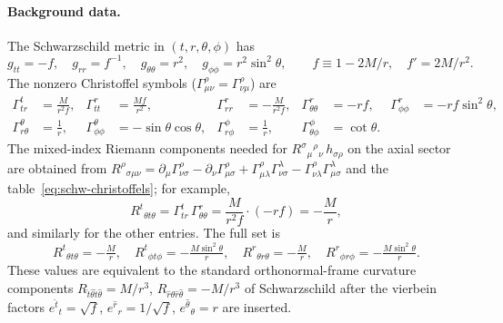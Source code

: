 \paragraph{Background data.}
The Schwarzschild metric in $(t,r,\theta,\phi)$ has
\begin{equation}
  g_{tt} = -f,\quad
  g_{rr} = f^{-1},\quad
  g_{\theta\theta} = r^{2},\quad
  g_{\phi\phi} = r^{2}\sin^{2}\theta,\qquad
  f \equiv 1 - 2M/r,\quad f' = 2M/r^{2}.
\end{equation}
The nonzero Christoffel symbols
($\Gamma^{\rho}_{\mu\nu} = \Gamma^{\rho}_{\nu\mu}$) are
\begin{equation}
\begin{aligned}
  \Gamma^{t}_{tr} &= \tfrac{M}{r^{2}f}, &
  \Gamma^{r}_{tt} &= \tfrac{Mf}{r^{2}}, &
  \Gamma^{r}_{rr} &= -\tfrac{M}{r^{2}f}, &
  \Gamma^{r}_{\theta\theta} &= -rf, &
  \Gamma^{r}_{\phi\phi} &= -rf\sin^{2}\theta,\\
  \Gamma^{\theta}_{r\theta} &= \tfrac{1}{r}, &
  \Gamma^{\theta}_{\phi\phi} &= -\sin\theta\cos\theta, &
  \Gamma^{\phi}_{r\phi} &= \tfrac{1}{r}, &
  \Gamma^{\phi}_{\theta\phi} &= \cot\theta. & &
\end{aligned}
\label{eq:schw-christoffels}
\end{equation}
The mixed-index Riemann components needed for
$R^{\sigma}{}_{\mu}{}^{\rho}{}_{\nu}\,h_{\sigma\rho}$ on the
axial sector are obtained from
$R^{\rho}{}_{\sigma\mu\nu} = \partial_{\mu}\Gamma^{\rho}_{\nu\sigma}
  - \partial_{\nu}\Gamma^{\rho}_{\mu\sigma}
  + \Gamma^{\rho}_{\mu\lambda}\Gamma^{\lambda}_{\nu\sigma}
  - \Gamma^{\rho}_{\nu\lambda}\Gamma^{\lambda}_{\mu\sigma}$
and the table~\eqref{eq:schw-christoffels}; for example,
\begin{equation}
  R^{t}{}_{\theta t\theta}
  = \Gamma^{t}_{tr}\,\Gamma^{r}_{\theta\theta}
  = \frac{M}{r^{2}f}\cdot(-rf)
  = -\frac{M}{r},
\end{equation}
and similarly for the other entries. The full set is
\begin{equation}
  R^{t}{}_{\theta t\theta} = -\tfrac{M}{r},\quad
  R^{t}{}_{\phi t\phi}     = -\tfrac{M\sin^{2}\theta}{r},\quad
  R^{r}{}_{\theta r\theta} = -\tfrac{M}{r},\quad
  R^{r}{}_{\phi r\phi}     = -\tfrac{M\sin^{2}\theta}{r}.
\label{eq:schw-riemann}
\end{equation}
These values are equivalent to the standard orthonormal-frame
curvature components
$R_{\hat t\hat\theta\hat t\hat\theta} = M/r^{3}$,
$R_{\hat r\hat\theta\hat r\hat\theta} = -M/r^{3}$ of
Schwarzschild after the vierbein factors
$e^{\hat t}{}_{t}=\sqrt{f}$, $e^{\hat r}{}_{r}=1/\sqrt{f}$,
$e^{\hat\theta}{}_{\theta}=r$ are inserted.


